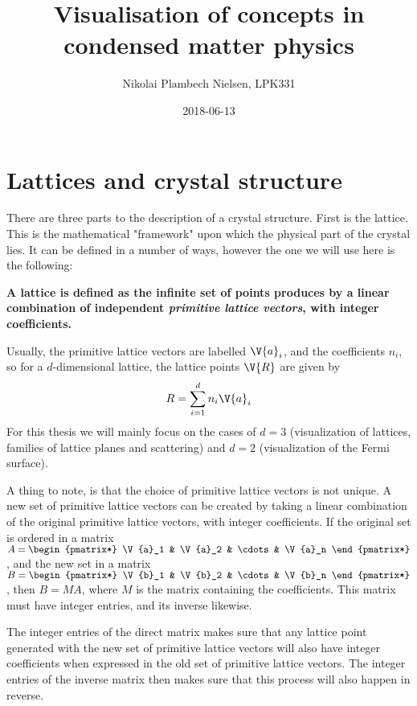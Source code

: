 \documentclass[a4paper,10pt]{article}
\title{Visualisation of concepts in condensed matter physics}
\author{Nikolai Plambech Nielsen, LPK331}
\date{2018-06-13}
\numberwithin{equation}{section}
\begin{document}
	
	\maketitle
	
	\tableofcontents
	
	\section{Lattices and crystal structure}
	There are three parts to the description of a crystal structure. First is the lattice. This is the mathematical "framework" upon which the physical part of the crystal lies. It can be defined in a number of ways, however the one we will use here is the following:
	
	\textbf{A lattice is defined as the infinite set of points produces by a linear combination of independent \emph{primitive lattice vectors}, with integer coefficients.}
	
	Usually, the primitive lattice vectors are labelled $ \V{a}_i $, and the coefficients $ n_i $, so for a $ d $-dimensional lattice, the lattice points $ \V{R} $ are given by
	\begin{equation}\label{key}
		R = \sum_{i = 1}^{d} n_i \V{a}_i
	\end{equation}
	For this thesis we will mainly focus on the cases of $ d = 3 $ (visualization of lattices, families of lattice planes and scattering) and $ d = 2 $ (visualization of the Fermi surface).
	
	A thing to note, is that the choice of primitive lattice vectors is not unique. A new set of primitive lattice vectors can be created by taking a linear combination of the original primitive lattice vectors, with integer coefficients. If the original set is ordered in a matrix $ A = \begin{pmatrix*} \V{a}_1 & \V{a}_2 & \cdots & \V{a}_n \end{pmatrix*}$, and the new set in a matrix $ B = \begin{pmatrix*} \V{b}_1 & \V{b}_2 & \cdots & \V{b}_n \end{pmatrix*} $, then $ B = MA $, where $ M $ is the matrix containing the coefficients. This matrix must have integer entries, and its inverse likewise.
	
	The integer entries of the direct matrix makes sure that any lattice point generated with the new set of primitive lattice vectors will also have integer coefficients when expressed in the old set of primitive lattice vectors. The integer entries of the inverse matrix then makes sure that this process will also happen in reverse.
	
\end{document}
